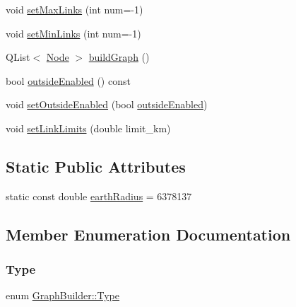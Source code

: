 \begin{DoxyCompactItemize}
\item 
void \mbox{\hyperlink{class_graph_builder_a201297610523f5f62f1a545854da23a5}{set\+Max\+Links}} (int num=-\/1)
\item 
void \mbox{\hyperlink{class_graph_builder_a42e3cd11d09a7a9865dfc7ceb09fdae7}{set\+Min\+Links}} (int num=-\/1)
\item 
Q\+List$<$ \mbox{\hyperlink{class_graph_builder_1_1_node}{Node}} $>$ \mbox{\hyperlink{class_graph_builder_a2ea956db6733ec1c6853da8bb89e0a15}{build\+Graph}} ()
\item 
bool \mbox{\hyperlink{class_graph_builder_ab4b68aa59d761cacb4661970b5a82adb}{outside\+Enabled}} () const
\item 
void \mbox{\hyperlink{class_graph_builder_a776edd41b6cc789b1416374ee44db1cd}{set\+Outside\+Enabled}} (bool \mbox{\hyperlink{class_graph_builder_ab4b68aa59d761cacb4661970b5a82adb}{outside\+Enabled}})
\item 
void \mbox{\hyperlink{class_graph_builder_a29028252b97c092d304b55a03a54ba9d}{set\+Link\+Limits}} (double limit\+\_\+km)
\end{DoxyCompactItemize}
\subsection*{Static Public Attributes}
\begin{DoxyCompactItemize}
\item 
static const double \mbox{\hyperlink{class_graph_builder_a16076357d9b569b4c2a0fb58b34774b0}{earth\+Radius}} = 6378137
\end{DoxyCompactItemize}


\subsection{Member Enumeration Documentation}
\mbox{\label{class_graph_builder_ad9125786780ea834b0368c7a599bb5d9}} 
\subsubsection{\texorpdfstring{Type}{Type}}
{\footnotesize\ttfamily enum \mbox{\hyperlink{class_graph_builder_ad9125786780ea834b0368c7a599bb5d9}{Graph\+Builder\+::\+Type}}}

